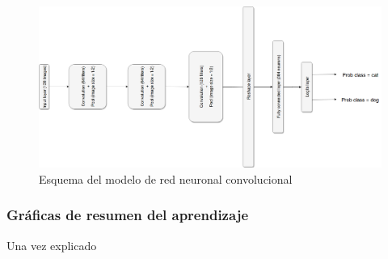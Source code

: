 \documentclass[11pt]{article}
\theoremstyle{plain}
\theoremstyle{definition}
\begin{document}
\begin{figure}[H]
  \centering \includegraphics[width=1\textwidth]{imgs/adam_model.png}
  \caption{Esquema del modelo de red neuronal convolucional}
\end{figure}




\subsubsection{Gráficas de resumen del aprendizaje}

Una vez explicado

\printbibliography
\end{document}
